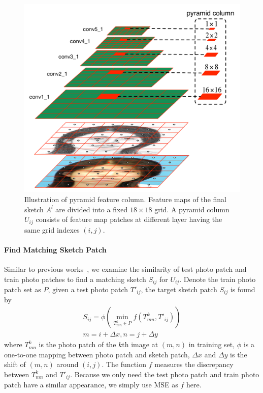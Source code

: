 \documentclass[10pt,twocolumn,letterpaper]{article}
\begin{document}
\begin{figure}[htbp]
\centering
\includegraphics[width=0.85\linewidth]{img/pyramidcolumn.pdf}
\caption{Illustration of pyramid feature column. Feature maps of the final sketch $A^{l}$ are divided into a fixed $18\times18$ grid. A pyramid column $U_{ij}$ consists of feature map patches at different layer having the same grid indexes $(i, j)$.}
\label{fig:pyramidcolumn}
\end{figure}

\paragraph*{Find Matching Sketch Patch} Similar to previous works~\cite{wang2009face,zhou2012markov}, we examine the similarity of test photo patch and train photo patches to find a matching sketch $S_{ij}$ for $U_{ij}$. Denote the train photo patch set as $P$, given a test photo patch $T'_{ij}$, the target sketch patch $S_{ij}$ is found by
\begin{gather}
S_{ij} = \phi(\min_{T^k_{mn} \in P} f(T^k_{mn}, T'_{ij})) \\
m = i + \Delta x, n = j + \Delta y
\end{gather}
where $T^k_{mn}$ is the photo patch of the $k$th image at $(m, n)$ in training set, $\phi$ is a one-to-one mapping between photo patch and sketch patch, $\Delta x$ and $\Delta y$ is the shift of $(m, n)$ around $(i, j)$. The function $f$ measures the discrepancy between $T^k_{mn}$ and $T'_{ij}$. Because we only need the test photo patch and train photo patch have a similar appearance, we simply use MSE as $f$ here.
\end{document}
